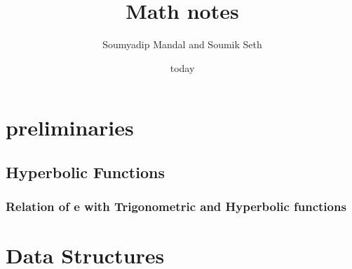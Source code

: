 \documentclass{book}
\title{Math notes}
\author{Soumyadip Mandal and Soumik Seth}
\date{today}
\begin{document}
\maketitle

\tableofcontents

\chapter{preliminaries}

\section{Hyperbolic Functions}

\subsection{Relation of e with Trigonometric and Hyperbolic functions}

\chapter{Data Structures}
\end{document}
